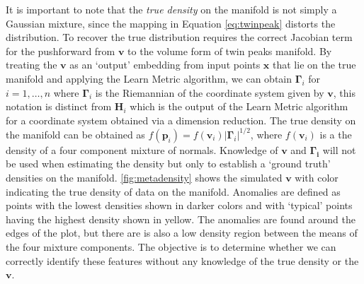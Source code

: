 \documentclass[11pt,a4paper,]{article}
\begin{document}
It is important to note that the \emph{true density} on the manifold is not simply a Gaussian mixture, since the mapping in Equation \eqref{eq:twinpeak} distorts the distribution. To recover the true distribution requires the correct Jacobian term for the pushforward from \(\pmb{v}\) to the volume form of twin peaks manifold. By treating the \(\pmb{v}\) as an `output' embedding from input points \(\pmb{x}\) that lie on the true manifold and applying the Learn Metric algorithm, we can obtain \(\pmb{\Gamma}_i\) for \(i=1,\dots,n\) where \(\pmb{\Gamma}_i\) is the Riemannian of the coordinate system given by \(\pmb{v}\), this notation is distinct from \(\pmb{H}_i\) which is the output of the Learn Metric algorithm for a coordinate system obtained via a dimension reduction. The true density on the manifold can be obtained as \(f(\pmb{p}_i)=f(\pmb{v}_i)|\pmb{\Gamma}_i|^{1/2}\), where \(f(\pmb{v}_i)\) is a the density of a four component mixture of normals. Knowledge of \(\pmb{v}\) and \(\pmb{\Gamma_i}\) will not be used when estimating the density but only to establish a `ground truth' densities on the manifold. \autoref{fig:metadensity} shows the simulated \(\pmb{v}\) with color indicating the true density of data on the manifold. Anomalies are defined as points with the lowest densities shown in darker colors and with `typical' points having the highest density shown in yellow. The anomalies are found around the edges of the plot, but there are is also a low density region between the means of the four mixture components. The objective is to determine whether we can correctly identify these features without any knowledge of the true density or the \(\pmb{v}\).
\end{document}
